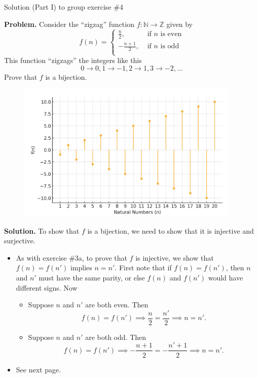 \documentclass[10pt]{beamer}
\begin{document}
\begin{frame}{Solution (Part I) to group exercise \#4}
\scriptsize 
\begin{minipage}{0.5\textwidth}
\textbf{Problem.}  Consider the \enquote{zigzag} function $f: \mathbb{N} \to \mathbb{Z}$ given by 
	\[ f(n) = 
	\begin{cases}
	\frac{n}{2}, & \text{ if $n$ is even} \\
	-\frac{n+1}{2}, & \text{ if $n$ is odd} \\
	\end{cases}
	\]
	This function \enquote{zigzags} the integers like this
	\[ 0 \to 0, 1 \to -1, 2 \to 1, 3 \to -2, \hdots \]
	Prove that $f$ is a bijection.	
\end{minipage}
\hfill 
\begin{minipage}{0.48\textwidth}
\begin{figure}
\includegraphics[width=0.95\textwidth]{images/zig_zag_function.png}	
\end{figure}
\end{minipage}
\vfill 
\textbf{Solution.}
To show that $f$ is a bijection, we need to show that it is injective and surjective.
		\begin{itemize} \scriptsize 
		\item {}  As with exercise \#3a, to prove that $f$ is injective, we show that  $f(n) = f(n')$ implies $n =n'$. First note that if $f(n)=f(n')$, then $n$ and $n'$ must have the same parity, or else $f(n)$ and $f(n')$ would have different signs.  Now
		\begin{itemize} \scriptsize 
		\item Suppose $n$ and $n'$ are both even.  Then 
		\[ f(n) = f(n') \implies \frac{n}{2} = \frac{n'}{2} \implies n=n'. \]
		\item Suppose $n$ and $n'$ are both odd.  Then 
		\[ f(n) = f(n') \implies -\frac{n+1}{2} = -\frac{n'+1}{2} \implies n=n'. \]
		\end{itemize} 
				\item {} See next page.
		\end{itemize}
\end{frame}
\end{document}
